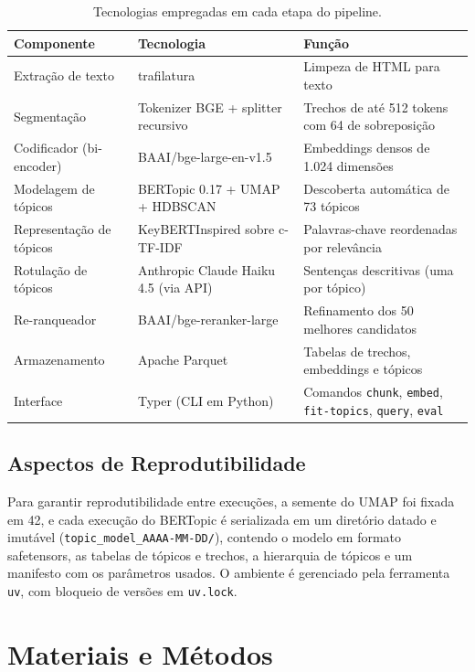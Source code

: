 \documentclass[11pt,a4paper]{article}
\begin{document}
\begin{table}[!ht]
\caption{Tecnologias empregadas em cada etapa do pipeline.}
\label{tab:tecnologias}
\centering
\small
\begin{tabular}{p{3.0cm} p{4.0cm} p{5.0cm}}
\toprule
\textbf{Componente} & \textbf{Tecnologia} & \textbf{Função} \\
\midrule
Extração de texto & trafilatura & Limpeza de HTML para texto \\
Segmentação & Tokenizer BGE + splitter recursivo & Trechos de até 512 tokens com 64 de sobreposição \\
Codificador (bi-encoder) & BAAI/bge-large-en-v1.5 & Embeddings densos de 1.024 dimensões \\
Modelagem de tópicos & BERTopic 0.17 + UMAP + HDBSCAN & Descoberta automática de 73 tópicos \\
Representação de tópicos & KeyBERTInspired sobre c-TF-IDF & Palavras-chave reordenadas por relevância \\
Rotulação de tópicos & Anthropic Claude Haiku 4.5 (via API) & Sentenças descritivas (uma por tópico) \\
Re-ranqueador & BAAI/bge-reranker-large & Refinamento dos 50 melhores candidatos \\
Armazenamento & Apache Parquet & Tabelas de trechos, embeddings e tópicos \\
Interface & Typer (CLI em Python) & Comandos \texttt{chunk}, \texttt{embed}, \texttt{fit-topics}, \texttt{query}, \texttt{eval} \\
\bottomrule
\end{tabular}
\end{table}

\subsection{Aspectos de Reprodutibilidade}

Para garantir reprodutibilidade entre execuções, a semente do UMAP foi fixada em 42, e cada execução do BERTopic é serializada em um diretório datado e imutável (\texttt{topic\_model\_AAAA-MM-DD/}), contendo o modelo em formato safetensors, as tabelas de tópicos e trechos, a hierarquia de tópicos e um manifesto com os parâmetros usados. O ambiente é gerenciado pela ferramenta \texttt{uv}, com bloqueio de versões em \texttt{uv.lock}.

\section{Materiais e Métodos}
\end{document}
